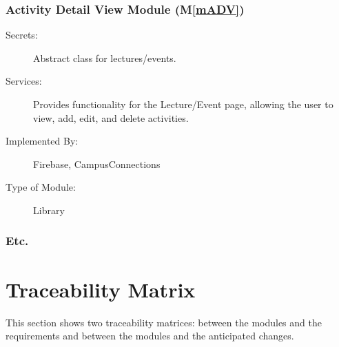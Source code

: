 \documentclass[12pt, titlepage]{article}
\newcommand{\mref}[1]{M\ref{#1}}
\begin{document}
\subsubsection{Activity Detail View Module (\mref{mADV})}
\begin{description}
  \item[Secrets:]Abstract class for lectures/events.
  \item[Services:]Provides functionality for the Lecture/Event page, allowing the user to view, add, edit, and delete activities.
  \item[Implemented By:] Firebase, CampusConnections
  \item[Type of Module:] Library
  \end{description}

\subsubsection{Etc.}

\section{Traceability Matrix} \label{SecTM}

This section shows two traceability matrices: between the modules and the
requirements and between the modules and the anticipated changes.
\end{document}
